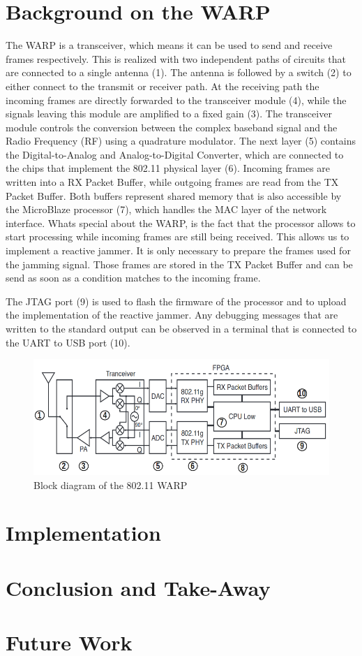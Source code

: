\documentclass[sigconf]{acmart}
\begin{document}
\section{Background on the WARP}
The WARP is a transceiver, which means it can be used to send and receive frames respectively. This
is realized with two independent paths of circuits that are connected to a single antenna (1). 
The antenna is followed by a switch (2) to either connect to the transmit or receiver
path. At the receiving path the incoming frames are directly forwarded to the transceiver module
(4), while the signals leaving this module are amplified to a fixed gain (3). The transceiver module
controls the conversion between the complex baseband signal and the Radio Frequency (RF) using a
quadrature modulator. The next layer (5) contains the Digital-to-Analog and Analog-to-Digital
Converter, which are connected to the chips that implement the 802.11 physical layer (6). Incoming
frames are written into a RX Packet Buffer, while outgoing frames are read from the TX Packet
Buffer. Both buffers represent shared memory that is also accessible by the MicroBlaze processor (7),
which handles the MAC layer of the network interface. Whats special about the WARP, is the fact that
the processor allows to start processing while incoming frames are still being received. This
allows us to implement a reactive jammer. It is only necessary to prepare the frames used for the
jamming signal. Those frames are stored in the TX Packet Buffer and can be send as soon as a
condition matches to the incoming frame.

The JTAG port (9) is used to flash the firmware of the processor and to upload the implementation of
the reactive jammer. Any debugging messages that are written to the standard output can be observed
in a terminal that is connected to the UART to USB port (10).

\begin{figure}[tb!]
	\hfill
	\includegraphics[width=1\linewidth]{block_diagram_warp.png}
	\caption{Block diagram of the 802.11 WARP}
	\label{fig:block_diagram_warp}
\end{figure}

\section{Implementation}

\section{Conclusion and Take-Away}

\section{Future Work}



 
\end{document}
